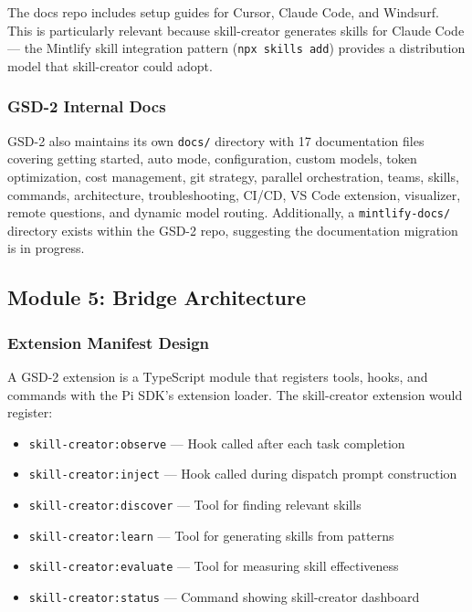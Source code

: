 \documentclass[11pt,letterpaper]{article}
\begin{document}
The docs repo includes setup guides for Cursor, Claude Code, and Windsurf. This is particularly relevant because skill-creator generates skills for Claude Code --- the Mintlify skill integration pattern (\texttt{npx skills add}) provides a distribution model that skill-creator could adopt.

\subsubsection{GSD-2 Internal Docs}

GSD-2 also maintains its own \texttt{docs/} directory with 17 documentation files covering getting started, auto mode, configuration, custom models, token optimization, cost management, git strategy, parallel orchestration, teams, skills, commands, architecture, troubleshooting, CI/CD, VS Code extension, visualizer, remote questions, and dynamic model routing. Additionally, a \texttt{mintlify-docs/} directory exists within the GSD-2 repo, suggesting the documentation migration is in progress.

\subsection{Module 5: Bridge Architecture}

\subsubsection{Extension Manifest Design}

A GSD-2 extension is a TypeScript module that registers tools, hooks, and commands with the Pi SDK's extension loader. The skill-creator extension would register:

\begin{itemize}[leftmargin=2em]
\item \texttt{skill-creator:observe} --- Hook called after each task completion
\item \texttt{skill-creator:inject} --- Hook called during dispatch prompt construction
\item \texttt{skill-creator:discover} --- Tool for finding relevant skills
\item \texttt{skill-creator:learn} --- Tool for generating skills from patterns
\item \texttt{skill-creator:evaluate} --- Tool for measuring skill effectiveness
\item \texttt{skill-creator:status} --- Command showing skill-creator dashboard
\end{itemize}
\end{document}
